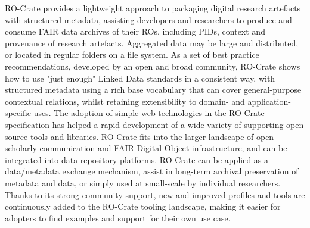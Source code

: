 \markdownRendererInterblockSeparator
{}RO-Crate provides a lightweight approach to packaging digital research artefacts with structured metadata, assisting developers and researchers to produce and consume FAIR data archives of their ROs, including PIDs, context and provenance of research artefacts. Aggregated data may be large and distributed, or located in regular folders on a file system. \markdownRendererInterblockSeparator
{}As a set of best practice recommendations, developed by an open and broad community, RO-Crate shows how to use "just enough" Linked Data standards in a consistent way, with structured metadata using a rich base vocabulary that can cover general-purpose contextual relations, whilst retaining extensibility to domain- and application-specific uses. \markdownRendererInterblockSeparator
{}The adoption of simple web technologies in the RO-Crate specification has helped a rapid development of a wide variety of supporting open source tools and libraries. RO-Crate fits into the larger landscape of open scholarly communication and FAIR Digital Object infrastructure, and can be integrated into data repository platforms. RO-Crate can be applied as a data/metadata exchange mechanism, assist in long-term archival preservation of metadata and data, or simply used at small-scale by individual researchers. Thanks to its strong community support, new and improved profiles and tools are continuously added to the RO-Crate tooling landscape, making it easier for adopters to find examples and support for their own use case.\relax